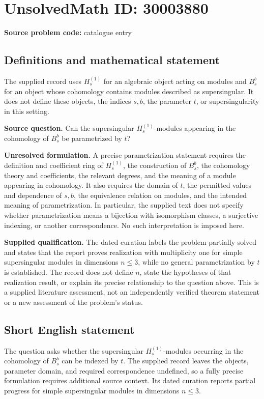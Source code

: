 \documentclass[11pt]{article}
\begin{document}
\section*{UnsolvedMath ID: 30003880}
\textbf{Source problem code:} catalogue entry
\subsection{Definitions and mathematical statement}
The supplied record uses \(H_s^{(1)}\) for an algebraic object acting on modules and \(B_s^b\) for an object whose cohomology contains modules described as supersingular. It does not define these objects, the indices \(s,b\), the parameter \(t\), or supersingularity in this setting.

\textbf{Source question.} Can the supersingular \(H_s^{(1)}\)-modules appearing in the cohomology of \(B_s^b\) be parametrized by \(t\)?

\textbf{Unresolved formulation.} A precise parametrization statement requires the definition and coefficient ring of \(H_s^{(1)}\), the construction of \(B_s^b\), the cohomology theory and coefficients, the relevant degrees, and the meaning of a module appearing in cohomology. It also requires the domain of \(t\), the permitted values and dependence of \(s,b\), the equivalence relation on modules, and the intended meaning of parametrization. In particular, the supplied text does not specify whether parametrization means a bijection with isomorphism classes, a surjective indexing, or another correspondence. No such interpretation is imposed here.

\textbf{Supplied qualification.} The dated curation labels the problem partially solved and states that the report proves realization with multiplicity one for simple supersingular modules in dimensions \(n\leq 3\), while no general parametrization by \(t\) is established. The record does not define \(n\), state the hypotheses of that realization result, or explain its precise relationship to the question above. This is a supplied literature assessment, not an independently verified theorem statement or a new assessment of the problem's status.
\subsection{Short English statement}
The question asks whether the supersingular \(H_s^{(1)}\)-modules occurring in the cohomology of \(B_s^b\) can be indexed by \(t\). The supplied record leaves the objects, parameter domain, and required correspondence undefined, so a fully precise formulation requires additional source context. Its dated curation reports partial progress for simple supersingular modules in dimensions \(n\leq 3\).
\end{document}
